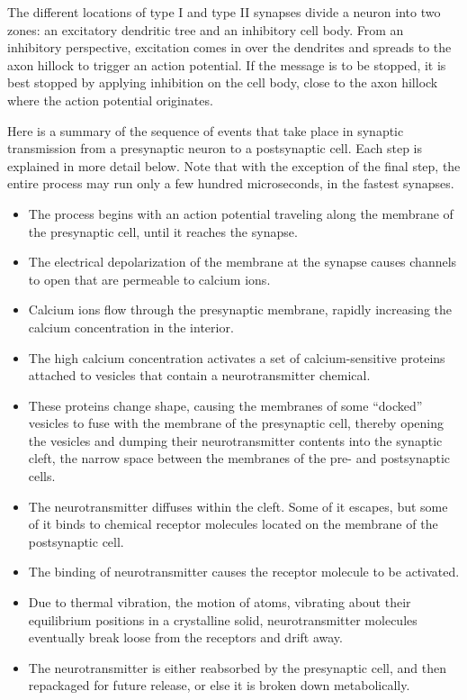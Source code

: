 \documentclass[]{book}
\providecommand{\tightlist}{%
  \setlength{\itemsep}{0pt}\setlength{\parskip}{0pt}}
\begin{document}
The different locations of type I and type II synapses divide a neuron into two zones: an excitatory dendritic tree and an inhibitory cell body. From an inhibitory perspective, excitation comes in over the dendrites and spreads to the axon hillock to trigger an action potential. If the message is to be stopped, it is best stopped by applying inhibition on the cell body, close to the axon hillock where the action potential originates.

Here is a summary of the sequence of events that take place in synaptic transmission from a presynaptic neuron to a postsynaptic cell. Each step is explained in more detail below. Note that with the exception of the final step, the entire process may run only a few hundred microseconds, in the fastest synapses.

\begin{itemize}
\tightlist
\item
  The process begins with an action potential traveling along the membrane of the presynaptic cell, until it reaches the synapse.
\item
  The electrical depolarization of the membrane at the synapse causes channels to open that are permeable to calcium ions.
\item
  Calcium ions flow through the presynaptic membrane, rapidly increasing the calcium concentration in the interior.
\item
  The high calcium concentration activates a set of calcium-sensitive proteins attached to vesicles that contain a neurotransmitter chemical.
\item
  These proteins change shape, causing the membranes of some ``docked'' vesicles to fuse with the membrane of the presynaptic cell, thereby opening the vesicles and dumping their neurotransmitter contents into the synaptic cleft, the narrow space between the membranes of the pre- and postsynaptic cells.
\item
  The neurotransmitter diffuses within the cleft. Some of it escapes, but some of it binds to chemical receptor molecules located on the membrane of the postsynaptic cell.
\item
  The binding of neurotransmitter causes the receptor molecule to be activated.
\item
  Due to thermal vibration, the motion of atoms, vibrating about their equilibrium positions in a crystalline solid, neurotransmitter molecules eventually break loose from the receptors and drift away.
\item
  The neurotransmitter is either reabsorbed by the presynaptic cell, and then repackaged for future release, or else it is broken down metabolically.
\end{itemize}
\end{document}
